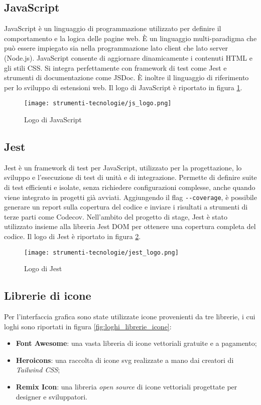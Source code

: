 \subsection*{JavaScript}

JavaScript è un linguaggio di programmazione utilizzato per definire il comportamento e la logica delle pagine web. È un linguaggio multi-paradigma che può essere impiegato sia nella programmazione lato client che lato server (Node.js). JavaScript consente di aggiornare dinamicamente i contenuti HTML e gli stili CSS. Si integra perfettamente con \gls{framework} di test come Jest e strumenti di documentazione come JSDoc. È inoltre il linguaggio di riferimento per lo sviluppo di estensioni web. Il logo di JavaScript è riportato in figura \ref{fig:logo_javascript}.

\begin{figure}[H]
  \centering 
  \texttt{[image: strumenti-tecnologie/js\_logo.png]} 
  \caption{Logo di JavaScript}
  \label{fig:logo_javascript} 
\end{figure}

\subsection*{Jest}

Jest è un \gls{framework} di test per JavaScript, utilizzato per la progettazione, lo sviluppo e l’esecuzione di test di unità e di integrazione. Permette di definire suite di test efficienti e isolate, senza richiedere configurazioni complesse, anche quando viene integrato in progetti già avviati. Aggiungendo il flag \verb|--coverage|, è possibile generare un report sulla copertura del codice e inviare i risultati a strumenti di terze parti come Codecov. Nell’ambito del progetto di stage, Jest è stato utilizzato insieme alla libreria Jest DOM per ottenere una copertura completa del codice. Il logo di Jest è riportato in figura \ref{fig:logo_jest}.

\begin{figure}[H]
  \centering 
  \texttt{[image: strumenti-tecnologie/jest\_logo.png]}
  \caption{Logo di Jest}
  \label{fig:logo_jest} 
\end{figure}

\subsection*{Librerie di icone}

Per l’interfaccia grafica sono state utilizzate icone provenienti da tre librerie, i cui loghi sono riportati in figura \ref{fig:loghi_librerie_icone}:
\begin{itemize}
  \item \textbf{Font Awesome}: una vasta libreria di icone vettoriali gratuite e a pagamento;
  \item \textbf{Heroicons}: una raccolta di icone \gls{svg} realizzate a mano dai creatori di \textit{Tailwind CSS};
  \item \textbf{Remix Icon}: una libreria \textit{open source} di icone vettoriali progettate per designer e sviluppatori.
\end{itemize}


